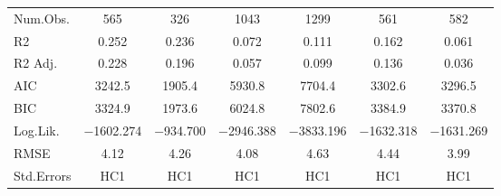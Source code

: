 \begin{table}
\begin{tabular}[t]{lcccccc}
\midrule
Num.Obs. & \num{565} & \num{326} & \num{1043} & \num{1299} & \num{561} & \num{582}\\
R2 & \num{0.252} & \num{0.236} & \num{0.072} & \num{0.111} & \num{0.162} & \num{0.061}\\
R2 Adj. & \num{0.228} & \num{0.196} & \num{0.057} & \num{0.099} & \num{0.136} & \num{0.036}\\
AIC & \num{3242.5} & \num{1905.4} & \num{5930.8} & \num{7704.4} & \num{3302.6} & \num{3296.5}\\
BIC & \num{3324.9} & \num{1973.6} & \num{6024.8} & \num{7802.6} & \num{3384.9} & \num{3370.8}\\
Log.Lik. & \num{-1602.274} & \num{-934.700} & \num{-2946.388} & \num{-3833.196} & \num{-1632.318} & \num{-1631.269}\\
RMSE & \num{4.12} & \num{4.26} & \num{4.08} & \num{4.63} & \num{4.44} & \num{3.99}\\
Std.Errors & HC1 & HC1 & HC1 & HC1 & HC1 & HC1\\
\bottomrule
\end{tabular}
\end{table}

